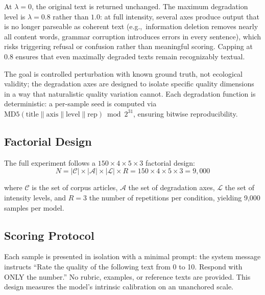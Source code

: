 \documentclass[11pt]{article}
\newcommand{\eg}{e.g.,\ }
\begin{document}
At $\lambda = 0$, the original text is returned unchanged. The maximum degradation level is $\lambda = 0.8$ rather than $1.0$: at full intensity, several axes produce output that is no longer parseable as coherent text (\eg information deletion removes nearly all content words, grammar corruption introduces errors in every sentence), which risks triggering refusal or confusion rather than meaningful scoring. Capping at $0.8$ ensures that even maximally degraded texts remain recognizably textual.

The goal is controlled perturbation with known ground truth, not ecological validity; the degradation axes are designed to isolate specific quality dimensions in a way that naturalistic quality variation cannot. Each degradation function is deterministic: a per-sample seed is computed via $\text{MD5}(\text{title} \| \text{axis} \| \text{level} \| \text{rep}) \bmod 2^{31}$, ensuring bitwise reproducibility.

\subsection{Factorial Design}

The full experiment follows a $150 \times 4 \times 5 \times 3$ factorial design:
\begin{equation}
    N = |\mathcal{C}| \times |\mathcal{A}| \times |\mathcal{L}| \times R = 150 \times 4 \times 5 \times 3 = 9{,}000
    \label{eq:design}
\end{equation}

\noindent where $\mathcal{C}$ is the set of corpus articles, $\mathcal{A}$ the set of degradation axes, $\mathcal{L}$ the set of intensity levels, and $R = 3$ the number of repetitions per condition, yielding 9{,}000 samples per model.

\subsection{Scoring Protocol}

Each sample is presented in isolation with a minimal prompt: the system message instructs ``Rate the quality of the following text from 0 to 10. Respond with ONLY the number.'' No rubric, examples, or reference texts are provided. This design measures the model's intrinsic calibration on an unanchored scale.
\end{document}
